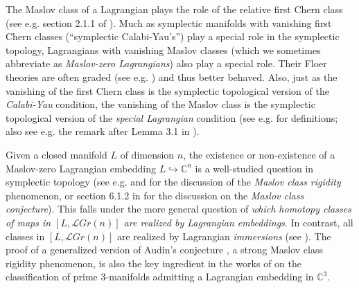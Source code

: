 \documentclass[10pt]{amsart}
\numberwithin{equation}{section}
\theoremstyle{plain}
\theoremstyle{definition}
\theoremstyle{remark}
\numberwithin{equation}{section}
\newcommand{\C}{\mathbb{C}}
\newcommand{\mc}[1]{\mathcal{#1}}
\begin{document}
The Maslov class of a Lagrangian plays the role of the relative first Chern class (see e.g. section 2.1.1 of \cite{FOOO1}).
Much as symplectic manifolds with vanishing first Chern classes (``symplectic Calabi-Yau's'') play a special role in the symplectic topology,
Lagrangians with vanishing Maslov classes (which we sometimes abbreviate as \emph{Maslov-zero Lagrangians}) also play a special role.
Their Floer theories are often graded  (see e.g. \cite{SeidelGraded}) and thus better behaved.
Also, just as the vanishing of the first Chern class is the symplectic topological version of the \emph{Calabi-Yau} condition, the vanishing of the Maslov class is the symplectic topological version of the \emph{special Lagrangian} condition (see e.g. \cite{HarveyLawson,JoyceSlag} for definitions; also see e.g. the remark after Lemma 3.1 in \cite{AurouxTDuality}).




Given a closed manifold $L$ of dimension $n$, the existence or non-existence of a Maslov-zero Lagrangian embedding $L\hookrightarrow \C^n$ is a well-studied question in symplectic topology (see e.g. \cite{AudinConj} and \cite{AudinLalondePolterovich} for the discussion of the \emph{Maslov class rigidity} phenomenon, or section 6.1.2 in \cite{FOOO1} for the discussion on the \emph{Maslov class conjecture}). 
This falls under the more general question of \emph{which homotopy classes of maps in $[L,\mc{L}Gr(n)]$ are realized by Lagrangian embeddings}. In contrast,  all classes in $[L,\mc{L}Gr(n)]$ are realized by Lagrangian \emph{immersions} (see \cite{LeesImmer,GromovPDR}). 
The proof of a generalized version of Audin's conjecture \cite{AudinConj}, a strong Maslov class rigidity phenomenon,  is also the key ingredient in the works of \cite{FukayaLagrangian,Irie2} on the classification of prime 3-manifolds admitting a Lagrangian embedding in $\C^3$.
\end{document}
